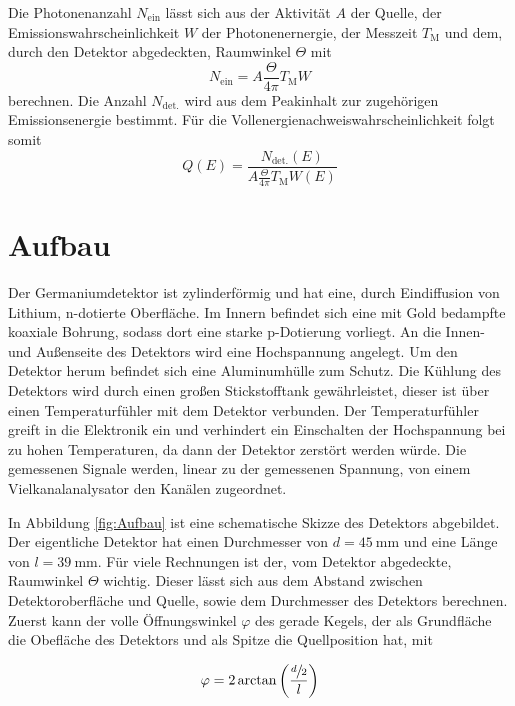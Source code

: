 Die Photonenanzahl $N_\text{ein}$ lässt sich aus der Aktivität $A$ der Quelle, der Emissionswahrscheinlichkeit $W$ der Photonenernergie, der Messzeit $T_\text{M}$ und dem, durch den Detektor abgedeckten, Raumwinkel $\Theta$ mit
\begin{equation*}
  N_\text{ein} = A \frac{\Theta}{4 \pi} T_\text{M} W
\end{equation*}
berechnen.
Die Anzahl $N_\text{det.}$ wird aus dem Peakinhalt zur zugehörigen Emissionsenergie bestimmt.
Für die Vollenergienachweiswahrscheinlichkeit folgt somit
\begin{equation}
  Q(E) = \frac{N_\text{det.}(E)}{A \frac{\Theta}{4 \pi} T_\text{M} W(E)}
  \label{eqn:Vollenergienachweiswahrscheinlichkeit}
\end{equation}

\section{Aufbau}
Der Germaniumdetektor ist zylinderförmig und hat eine, durch Eindiffusion von Lithium, n-dotierte Oberfläche.
Im Innern befindet sich eine mit Gold bedampfte koaxiale Bohrung, sodass dort eine starke p-Dotierung vorliegt.
An die Innen- und Außenseite des Detektors wird eine Hochspannung angelegt.
Um den Detektor herum befindet sich eine Aluminumhülle zum Schutz.
Die Kühlung des Detektors wird durch einen großen Stickstofftank gewährleistet, dieser ist über einen Temperaturfühler mit dem Detektor verbunden.
Der Temperaturfühler greift in die Elektronik ein und verhindert ein Einschalten der Hochspannung bei zu hohen Temperaturen, da dann der Detektor zerstört werden würde.
Die gemessenen Signale werden, linear zu der gemessenen Spannung, von einem Vielkanalanalysator den Kanälen zugeordnet.

In Abbildung \ref{fig:Aufbau} ist eine schematische Skizze des Detektors abgebildet.
Der eigentliche Detektor hat einen Durchmesser von $d = \SI{45}{\milli\meter}$ und eine Länge von $l=\SI{39}{\milli\meter}$.
Für viele Rechnungen ist der, vom Detektor abgedeckte, Raumwinkel $\Theta$ wichtig.
Dieser lässt sich aus dem Abstand zwischen Detektoroberfläche und Quelle, sowie dem Durchmesser des Detektors berechnen.
Zuerst kann der volle Öffnungswinkel $\varphi$ des gerade Kegels, der als Grundfläche die Obefläche des Detektors und als Spitze die Quellposition hat, mit

\begin{equation*}
  \varphi = 2\arctan\left(\frac{\sfrac{d}{2}}{l}\right)
\end{equation*}

